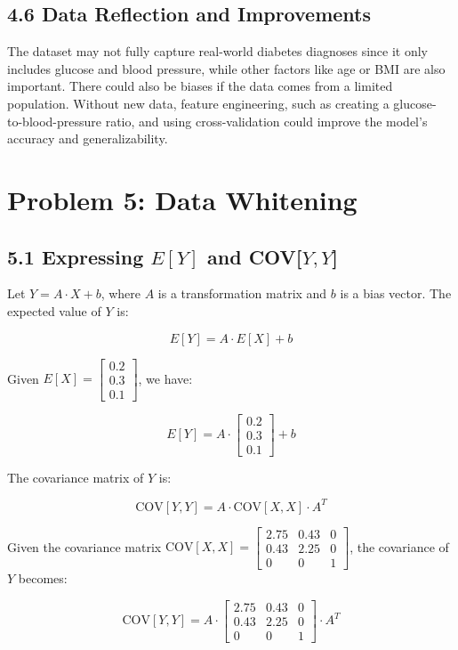 \documentclass{article}
\begin{document}
\subsection*{4.6 Data Reflection and Improvements}
The dataset may not fully capture real-world diabetes diagnoses since it only
includes glucose and blood pressure, while other factors like age or BMI are
also important. There could also be biases if the data comes from a limited
population. Without new data, feature engineering, such as creating a glucose-
to-blood-pressure ratio, and using cross-validation could improve the model’s
accuracy and generalizability.

\section*{Problem 5: Data Whitening}

\subsection*{5.1 Expressing $E[Y]$ and COV[$Y, Y$]}
Let $Y = A \cdot X + b$, where $A$ is a transformation matrix and $b$ is a bias vector.
The expected value of $Y$ is:

\[
E[Y] = A \cdot E[X] + b
\]

Given $E[X] = \begin{bmatrix} 0.2 \\ 0.3 \\ 0.1 \end{bmatrix}$, we have:

\[
E[Y] = A \cdot \begin{bmatrix} 0.2 \\ 0.3 \\ 0.1 \end{bmatrix} + b
\]

The covariance matrix of $Y$ is:

\[
\text{COV}[Y, Y] = A \cdot \text{COV}[X, X] \cdot A^T
\]

Given the covariance matrix $\text{COV}[X, X] = \begin{bmatrix} 2.75 & 0.43 & 0 \\ 0.43 & 2.25 & 0 \\ 0 & 0 & 1 \end{bmatrix}$, the covariance
of $Y$ becomes:

\[
\text{COV}[Y, Y] = A \cdot \begin{bmatrix} 2.75 & 0.43 & 0 \\ 0.43 & 2.25 & 0 \\ 0 & 0 & 1 \end{bmatrix} \cdot A^T
\]
\end{document}
